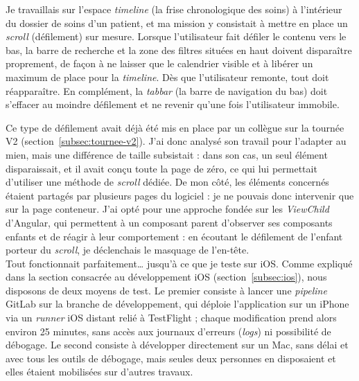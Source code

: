 \documentclass{article}
\begin{document}
Je travaillais sur l'espace \textit{timeline} (la frise chronologique des soins) à l'intérieur du dossier de soins d'un patient, et ma mission y consistait à mettre en place un \textit{scroll} (défilement) sur mesure. Lorsque l'utilisateur fait défiler le contenu vers le bas, la barre de recherche et la zone des filtres situées en haut doivent disparaître proprement, de façon à ne laisser que le calendrier visible et à libérer un maximum de place pour la \textit{timeline}. Dès que l'utilisateur remonte, tout doit réapparaître. En complément, la \textit{tabbar} (la barre de navigation du bas) doit s'effacer au moindre défilement et ne revenir qu'une fois l'utilisateur immobile.\\


Ce type de défilement avait déjà été mis en place par un collègue sur la tournée V2 (section~\ref{subsec:tournee-v2}). J'ai donc analysé son travail pour l'adapter au mien, mais une différence de taille subsistait : dans son cas, un seul élément disparaissait, et il avait conçu toute la page de zéro, ce qui lui permettait d'utiliser une méthode de \textit{scroll} dédiée. De mon côté, les éléments concernés étaient partagés par plusieurs pages du logiciel : je ne pouvais donc intervenir que sur la page conteneur. J'ai opté pour une approche fondée sur les \textit{ViewChild} d'Angular, qui permettent à un composant parent d'observer ses composants enfants et de réagir à leur comportement : en écoutant le défilement de l'enfant porteur du \textit{scroll}, je déclenchais le masquage de l'en-tête.\\

Tout fonctionnait parfaitement\ldots{} jusqu'à ce que je teste sur iOS. Comme expliqué dans la section consacrée au développement iOS (section~\ref{subsec:ios}), nous disposons de deux moyens de test. Le premier consiste à lancer une \textit{pipeline} GitLab sur la branche de développement, qui déploie l'application sur un iPhone via un \textit{runner} iOS distant relié à TestFlight ; chaque modification prend alors environ 25 minutes, sans accès aux journaux d'erreurs (\textit{logs}) ni possibilité de débogage. Le second consiste à développer directement sur un Mac, sans délai et avec tous les outils de débogage, mais seules deux personnes en disposaient et elles étaient mobilisées sur d'autres travaux.\\
\end{document}
